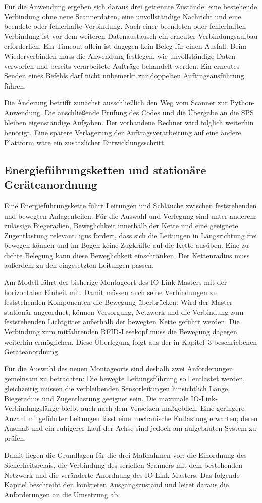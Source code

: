 Für die Anwendung ergeben sich daraus drei getrennte Zustände: eine bestehende Verbindung ohne neue Scannerdaten, eine unvollständige Nachricht und eine beendete oder fehlerhafte Verbindung. Nach einer beendeten oder fehlerhaften Verbindung ist vor dem weiteren Datenaustausch ein erneuter Verbindungsaufbau erforderlich. Ein Timeout allein ist dagegen kein Beleg für einen Ausfall. Beim Wiederverbinden muss die Anwendung festlegen, wie unvollständige Daten verworfen und bereits verarbeitete Aufträge behandelt werden. Ein erneutes Senden eines Befehls darf nicht unbemerkt zur doppelten Auftragsausführung führen.

Die Änderung betrifft zunächst ausschließlich den Weg vom Scanner zur Python-Anwendung. Die anschließende Prüfung des Codes und die Übergabe an die SPS bleiben eigenständige Aufgaben. Der vorhandene Rechner wird folglich weiterhin benötigt. Eine spätere Verlagerung der Auftragsverarbeitung auf eine andere Plattform wäre ein zusätzlicher Entwicklungsschritt.

\subsection{Energieführungsketten und stationäre Geräteanordnung}
\label{sec:grundlagen_energiekette}

Eine Energieführungskette führt Leitungen und Schläuche zwischen feststehenden und bewegten Anlagenteilen. Für die Auswahl und Verlegung sind unter anderem zulässige Biegeradien, Beweglichkeit innerhalb der Kette und eine geeignete Zugentlastung relevant. igus fordert, dass sich die Leitungen in Längsrichtung frei bewegen können und im Bogen keine Zugkräfte auf die Kette ausüben. Eine zu dichte Belegung kann diese Beweglichkeit einschränken. Der Kettenradius muss außerdem zu den eingesetzten Leitungen passen. \cite{igus_befuellung}

Am Modell fährt der bisherige Montageort des IO-Link-Masters mit der horizontalen Einheit mit. Damit müssen auch seine Verbindungen zu feststehenden Komponenten die Bewegung überbrücken. Wird der Master stationär angeordnet, können Versorgung, Netzwerk und die Verbindung zum feststehenden Lichtgitter außerhalb der bewegten Kette geführt werden. Die Verbindung zum mitfahrenden RFID-Lesekopf muss die Bewegung dagegen weiterhin ermöglichen. Diese Überlegung folgt aus der in Kapitel~3 beschriebenen Geräteanordnung.

Für die Auswahl des neuen Montageorts sind deshalb zwei Anforderungen gemeinsam zu betrachten: Die bewegte Leitungsführung soll entlastet werden, gleichzeitig müssen die verbleibenden Sensorleitungen hinsichtlich Länge, Biegeradius und Zugentlastung geeignet sein. Die maximale IO-Link-Verbindungslänge bleibt auch nach dem Versetzen maßgeblich. Eine geringere Anzahl mitgeführter Leitungen lässt eine mechanische Entlastung erwarten; deren Ausmaß und ein ruhigerer Lauf der Achse sind jedoch am aufgebauten System zu prüfen.

Damit liegen die Grundlagen für die drei Maßnahmen vor: die Einordnung des Sicherheitsrelais, die Verbindung des seriellen Scanners mit dem bestehenden Netzwerk und die veränderte Anordnung des IO-Link-Masters. Das folgende Kapitel beschreibt den konkreten Ausgangszustand und leitet daraus die Anforderungen an die Umsetzung ab.
